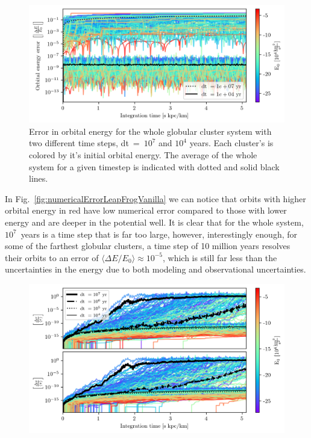         \begin{figure}
            \centering
            \includegraphics[width=\linewidth]{images/numericalErrorLeapFrogVanilla.png}
            \caption{Error in orbital energy for the whole globular cluster system with two different time steps, dt~=~$10^{7}$ and $10^{4}$ years. Each cluster's is colored by it's initial orbital energy. The average of the whole system for a given timestep is indicated with dotted and solid black lines. }
            \label{fig:numericalErrorLeapFrogVanilla.png}
        \end{figure}
        In Fig.~\ref{fig:numericalErrorLeapFrogVanilla} we can notice that orbits with higher orbital energy in red have low numerical error compared to those with lower energy and are deeper in the potential well. It is clear that for the whole system, $10^7$~years is a time step that is far too large, however, interestingly enough, for some of the farthest globular clusters, a time step of 10 million years resolves their orbits to an error of $\langle \Delta E / E_0 \rangle \approx 10^{-5}$, which is still far less than the uncertainties in the energy due to both modeling and observational uncertainties.
    
        \begin{figure}
            \centering
            \includegraphics[width=\linewidth]{images/numericalErrorReverseIntegration.png}
            \caption{}
            \label{fig:numericalErrorReverseIntegration.png}
        \end{figure}

